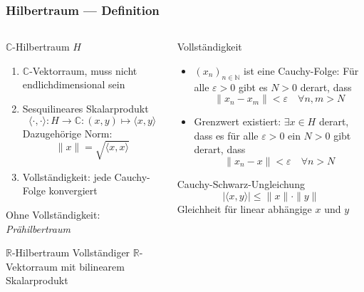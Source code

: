 %
%
%
\bgroup
\begin{frame}[t]
\setlength{\abovedisplayskip}{5pt}
\setlength{\belowdisplayskip}{5pt}
\frametitle{Hilbertraum --- Definition}
\vspace{-20pt}
\begin{columns}[t,onlytextwidth]
\begin{column}{0.48\textwidth}
\begin{block}{$\mathbb{C}$-Hilbertraum $H$}
\begin{enumerate}
\item $\mathbb{C}$-Vektorraum, muss nicht endlichdimensional sein
\item Sesquilineares Skalarprodukt
\[
\langle \cdot,\cdot\rangle
\colon H \to \mathbb{C}: (x,y) \mapsto \langle x,y\rangle
\]
Dazugehörige Norm:
\[
\|x\| = \sqrt{\langle x,x\rangle}
\]
\item Vollständigkeit: jede Cauchy-Folge konvergiert
\end{enumerate}
Ohne Vollständigkeit: {\em Prähilbertraum}
\end{block}
\begin{block}{$\mathbb{R}$-Hilbertraum}
Vollständiger $\mathbb{R}$-Vektorraum mit bilinearem Skalarprodukt
\end{block}
\end{column}
\begin{column}{0.48\textwidth}
\begin{block}{Vollständigkeit}
\begin{itemize}
\item $(x_n)_{n\in\mathbb{N}}$ ist eine Cauchy-Folge:
Für alle $\varepsilon>0$ gibt es $N>0$ derart, dass
\[
\| x_n-x_m\| < \varepsilon\quad\forall n,m>N
\]
\item Grenzwert existiert: $\exists x\in H$ derart, dass es für alle
$\varepsilon >0$ ein $N>0$ gibt derart, dass
\[
\|x_n-x\|<\varepsilon\quad\forall n>N
\]
\end{itemize}
\end{block}
\begin{block}{Cauchy-Schwarz-Ungleichung}
\[
|\langle x,y\rangle|
\le  \|x\| \cdot \|y\|
\]
Gleichheit für linear abhängige $x$ und $y$
\end{block}
\end{column}
\end{columns}
\end{frame}
\egroup
